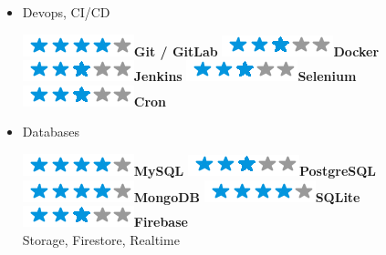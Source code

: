 \documentclass[]{friggeri-cv}
\begin{document}
\begin{flushleft}
\begin{multicols}{3}
\begin{itemize}
\item \large Devops, CI/CD \
\normalsize
\begin{flushleft}

\includegraphics[scale=0.40]{res/img/4stars.png}\hspace{1.5mm}\textbf{Git / GitLab}
\includegraphics[scale=0.40]{res/img/3stars.png}\hspace{1.5mm}\textbf{Docker}
\includegraphics[scale=0.40]{res/img/3stars.png}\hspace{1.5mm}\textbf{Jenkins}
\includegraphics[scale=0.40]{res/img/3stars.png}\hspace{1.5mm}\textbf{Selenium}
\includegraphics[scale=0.40]{res/img/3stars.png}\hspace{1.5mm}\textbf{Cron}
\end{flushleft}            

\columnbreak
\item \large Databases \
\normalsize
\begin{flushleft}

\includegraphics[scale=0.40]{res/img/4stars.png}\hspace{1.5mm}\textbf{MySQL}
\includegraphics[scale=0.40]{res/img/3stars.png}\hspace{1.5mm}\textbf{PostgreSQL}
\includegraphics[scale=0.40]{res/img/4stars.png}\hspace{1.5mm}\textbf{MongoDB}
\includegraphics[scale=0.40]{res/img/4stars.png}\hspace{1.5mm}\textbf{SQLite}
\includegraphics[scale=0.40]{res/img/3stars.png}\hspace{1.5mm}\textbf{Firebase}\\Storage, Firestore, Realtime\\
\end{flushleft}            


\end{itemize}
\end{multicols}
\end{flushleft}
\end{document}
